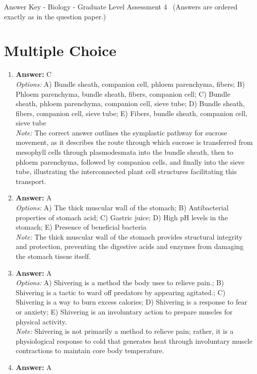 \documentclass[12pt]{article}
\begin{document}
\begin{center}
Answer Key - Biology - Graduate Level Assessment 4 \
\small (Answers are ordered exactly as in the question paper.)
\end{center}

\section*{Multiple Choice}
\begin{enumerate}[label=\arabic*.]
\item \textbf{Answer:} C
\\ \textit{Options:} A) Bundle sheath, companion cell, phloem parenchyma, fibers; B) Phloem parenchyma, bundle sheath, fibers, companion cell; C) Bundle sheath, phloem parenchyma, companion cell, sieve tube; D) Bundle sheath, fibers, companion cell, sieve tube; E) Fibers, bundle sheath, companion cell, sieve tube
\\ \textit{Note:} The correct answer outlines the symplastic pathway for sucrose movement, as it describes the route through which sucrose is transferred from mesophyll cells through plasmodesmata into the bundle sheath, then to phloem parenchyma, followed by companion cells, and finally into the sieve tube, illustrating the interconnected plant cell structures facilitating this transport.
\item \textbf{Answer:} A
\\ \textit{Options:} A) The thick muscular wall of the stomach; B) Antibacterial properties of stomach acid; C) Gastric juice; D) High pH levels in the stomach; E) Presence of beneficial bacteria
\\ \textit{Note:} The thick muscular wall of the stomach provides structural integrity and protection, preventing the digestive acids and enzymes from damaging the stomach tissue itself.
\item \textbf{Answer:} A
\\ \textit{Options:} A) Shivering is a method the body uses to relieve pain.; B) Shivering is a tactic to ward off predators by appearing agitated.; C) Shivering is a way to burn excess calories; D) Shivering is a response to fear or anxiety; E) Shivering is an involuntary action to prepare muscles for physical activity.
\\ \textit{Note:} Shivering is not primarily a method to relieve pain; rather, it is a physiological response to cold that generates heat through involuntary muscle contractions to maintain core body temperature.
\item \textbf{Answer:} A

\end{enumerate}
\end{document}
